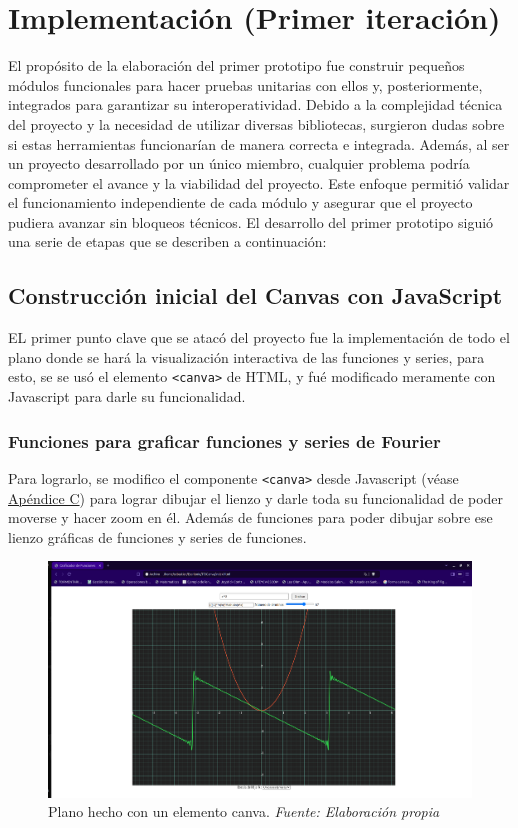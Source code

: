 \chapter{Implementación \newline (Primer iteración)}\label{ch:Implementación}
El propósito de la elaboración del primer prototipo fue construir pequeños módulos funcionales para hacer pruebas unitarias con ellos y, posteriormente, integrados para garantizar su interoperatividad. Debido a la complejidad técnica del proyecto y la necesidad de utilizar diversas bibliotecas, surgieron dudas sobre si estas herramientas funcionarían de manera correcta e integrada. Además, al ser un proyecto desarrollado por un único miembro, cualquier problema podría comprometer el avance y la viabilidad del proyecto. Este enfoque permitió validar el funcionamiento independiente de cada módulo y asegurar que el proyecto pudiera avanzar sin bloqueos técnicos.
El desarrollo del primer prototipo siguió una serie de etapas que se describen a continuación:

\section{Construcción inicial del Canvas con JavaScript}
EL primer punto clave que se atacó del proyecto fue la implementación de todo el plano donde se hará la visualización interactiva de las funciones y series, para esto, se se usó el elemento \texttt{<canva>} de HTML, y fué modificado meramente con Javascript para darle su funcionalidad.

\subsection{Funciones para graficar funciones y series de Fourier}
Para lograrlo, se modifico el componente \texttt{<canva>} desde Javascript (véase \hyperref[app3:canva_js]{Apéndice C}) para lograr dibujar el lienzo y darle toda su funcionalidad de poder moverse y hacer zoom en él. Además de funciones para poder dibujar sobre ese lienzo gráficas de funciones y series de funciones.
\begin{figure}[H]
	\centering
	\includegraphics[width=1\textwidth]{img/chapter06/prueba_grafica.png}
	\caption[Plano hecho con un elemento canva.]{Plano hecho con un elemento canva. \textit{Fuente: Elaboración propia}}
	\label{fig:prueba_grafica}
\end{figure}

